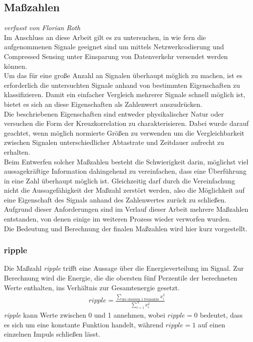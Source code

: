 \subsection{Maßzahlen}
\small\textit{verfasst von Florian Roth}
\normalsize
\\ Im Anschluss an diese Arbeit gilt es zu untersuchen, in wie fern die aufgenommenen Signale geeignet sind um mittels Netzwerkcodierung und Compressed Sensing unter Einsparung von Datenverkehr versendet werden können. 
\\ Um das für eine große Anzahl an Signalen überhaupt möglich zu machen, ist es erforderlich die untersuchten Signale anhand von  bestimmten Eigenschaften zu klassifizieren. Damit ein einfacher Vergleich mehrerer Signale schnell möglich ist, bietet es sich an diese Eigenschaften als Zahlenwert auszudrücken. 
\\ Die beschriebenen Eigenschaften sind entweder physikalischer Natur oder versuchen die Form der Kreuzkorrelation zu charakterisieren. Dabei wurde darauf geachtet, wenn möglich normierte Größen zu verwenden um die Vergleichbarkeit zwischen Signalen unterschiedlicher Abtastrate und Zeitdauer aufrecht zu erhalten. 
\\ Beim Entwerfen solcher Maßzahlen besteht die Schwierigkeit darin, möglichst viel aussagekräftige Information dahingehend zu vereinfachen, dass eine Überführung in eine Zahl überhaupt möglich ist. Gleichzeitig darf durch die Vereinfachung nicht die Aussagefähigkeit der Maßzahl zerstört werden, also die Möglichkeit auf eine Eigenschaft des Signals anhand des Zahlenwertes zurück zu schließen. Aufgrund dieser Anforderungen sind im Verlauf dieser Arbeit mehrere Maßzahlen entstanden, von denen einige im weiteren Prozess wieder verworfen wurden. 
\\Die Bedeutung und Berechnung der finalen Maßzahlen wird hier kurz vorgestellt. 
\subsubsection{ripple}
Die Maßzahl \textit{ripple} trifft eine Aussage über die Energieverteilung im Signal. Zur Berechnung wird die Energie, die die obersten fünf Perzentile der berechneten Werte enthalten, ins Verhältnis zur Gesamtenergie gesetzt. 
\begin{align*}
ripple = \frac{\sum_{\text{der obersten 5 Perzentile}}x_{i}^2}{\sum_{i=1}^{N}x_{i}^2}
\end{align*}
\textit{ripple} kann Werte zwischen 0 und 1 annehmen, wobei $ripple = 0$ bedeutet, dass es sich um eine konstante Funktion handelt, während $ripple = 1$ auf einen einzelnen Impuls schließen lässt.
